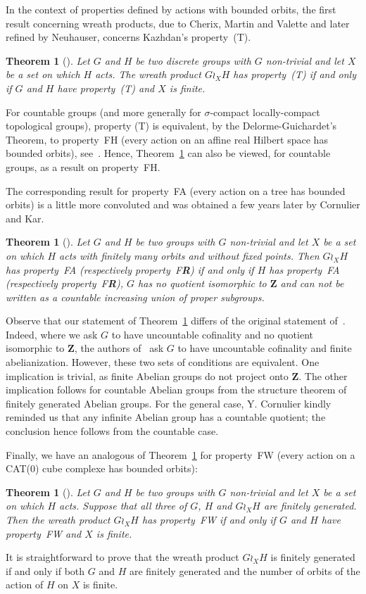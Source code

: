 \documentclass[a4paper]{article}
\newtheorem{thm}[lem]{Theorem}
\theoremstyle{definition}
\newcommand*{\field}[1]{\mathbf{#1}}
\newcommand*{\Z}{\field{Z}}
\newcommand*{\FH}{FH}
\newcommand*{\FW}{FW}
\newcommand*{\FA}{FA}
\newcommand*{\FR}{F\textbf{R}}
\begin{document}
In the context of properties defined by actions with bounded orbits, the first result concerning wreath products, due to Cherix, Martin and Valette and later refined by Neuhauser, concerns Kazhdan's property~(T).
%
%
\begin{thm}[\cite{MR2106770,MR2176470}] \label{T:Wreath_prop_T}
Let $G$ and $H$ be two discrete groups with $G$ non-trivial and let $X$ be a set on which $H$ acts.
The wreath product $G \wr_X H$ has property~(T) if and only if $G$ and $H$ have property~(T) and $X$ is finite.
\end{thm}
%
%
For countable groups (and more generally for $\sigma$-compact locally-compact topological groups), property (T) is equivalent, by the Delorme-Guichardet's Theorem, to property~\FH{} (every action on an affine real Hilbert space has bounded orbits), see~\cite[Thm. 2.12.4]{MR2415834}.
Hence, Theorem~\ref{T:Wreath_prop_T} can also be viewed, for countable groups, as a result on property~\FH.

The corresponding result for property~\FA{} (every action on a tree has bounded orbits) is a little more convoluted and was obtained a few years later by Cornulier and Kar.
%
%
\begin{thm}[\cite{MR2764930}]\label{Thm:FACK}
Let $G$ and $H$ be two groups with $G$ non-trivial and let $X$ be a set on which $H$ acts with finitely many orbits and without fixed points.
Then $G\wr_XH$ has property~\FA{} (respectively property~\FR) if and only if $H$ has property~\FA{} (respectively property~\FR), $G$ has no quotient isomorphic to $\Z$ and can not be written as a countable increasing union of proper subgroups.
\end{thm}
%
%
Observe that our statement of Theorem~\ref{Thm:FACK} differs of the original statement of~\cite{MR2764930}.
Indeed, where we ask $G$ to have uncountable cofinality and no quotient isomorphic to $\Z$, the authors of~\cite{MR2764930} ask $G$ to have uncountable cofinality and finite abelianization.
However, these two sets of conditions are equivalent.
One implication is trivial, as finite Abelian groups do not project onto $\Z$. The other implication follows for countable Abelian groups from the structure theorem of finitely generated Abelian groups.
For the general case, Y. Cornulier kindly reminded us that any infinite Abelian group has a countable quotient; the conclusion hence follows from the countable case.

Finally, we have an analogous of Theorem~\ref{T:Wreath_prop_T} for property~\FW{} (every action on a CAT(0) cube complexe has bounded orbits):
%
%
\begin{thm}[\cite{Cornulier2013,LS2020}]\label{Thm:PropFW}
Let $G$ and $H$ be two groups with $G$ non-trivial and let $X$ be a set on which $H$ acts.
Suppose that all three of $G$, $H$ and $G\wr_XH$ are finitely generated. Then the wreath product $G \wr_X H$ has property~\FW{} if and only if $G$ and $H$ have property~\FW{} and $X$ is finite.
\end{thm}
%
%
It is straightforward to prove that the wreath product $G \wr_X H$ is finitely generated if and only if both $G$ and $H$ are finitely generated and the number of orbits of the action of $H$ on $X$ is finite.
\end{document}
